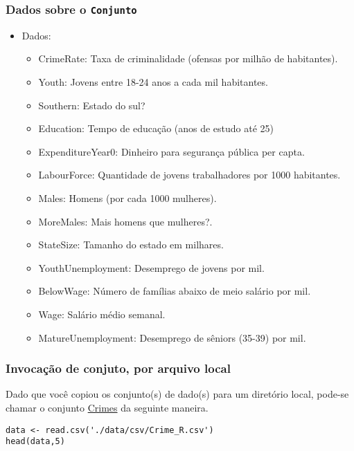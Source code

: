 \documentclass[11pt]{article}
\begin{document}
\subsubsection{Dados sobre o \texttt{Conjunto}}
\label{sec:orgb0846c6}
\begin{itemize}
\item Dados:
\begin{itemize}
\item CrimeRate: Taxa de criminalidade (ofensas por milhão de habitantes).
\item Youth: Jovens entre 18-24 anos a cada mil habitantes.
\item Southern: Estado do sul?
\item Education: Tempo de educação (anos de estudo até 25)
\item ExpenditureYear0: Dinheiro para segurança pública per capta.
\item LabourForce: Quantidade de jovens trabalhadores por 1000 habitantes.
\item Males: Homens (por cada 1000 mulheres).
\item MoreMales: Mais homens que mulheres?.
\item StateSize: Tamanho do estado em milhares.
\item YouthUnemployment: Desemprego de jovens por mil.
\item BelowWage: Número de famílias abaixo de meio salário por mil.
\item Wage: Salário médio semanal.
\item MatureUnemployment: Desemprego de sêniors (35-39) por mil.
\end{itemize}
\end{itemize}

\subsubsection{Invocação de conjuto, por arquivo local}
\label{sec:orgf571b4e}

Dado que você copiou os conjunto(s) de dado(s) para um diretório
local, pode-se chamar o conjunto \href{https://drive.google.com/file/d/1hZpHoEXbhZGvmtmrbcWpXYfBV-2ZD7uF/view?usp=sharing}{Crimes} da seguinte maneira.

\begin{verbatim}
data <- read.csv('./data/csv/Crime_R.csv')
head(data,5)
\end{verbatim}
\end{document}
